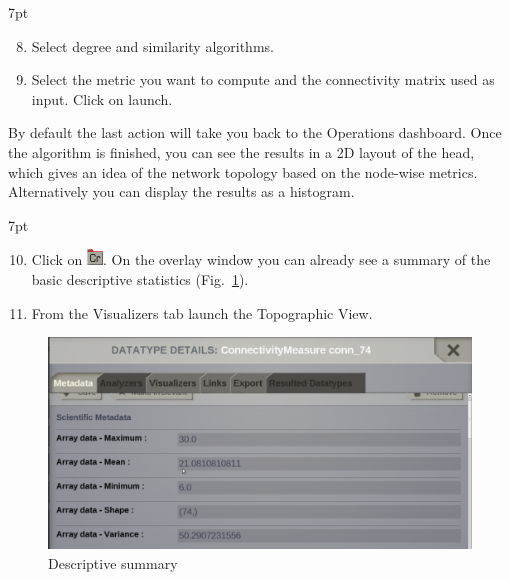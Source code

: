 \documentclass{tufte-handout}
\newenvironment{formal}{%
  \def\FrameCommand{%
    \hspace{1pt}%
    {\color{DarkBlue}\vrule width 2pt}%
    {\color{formalshade}\vrule width 4pt}%
    \colorbox{formalshade}%
  }%
  \MakeFramed{\advance\hsize-\width\FrameRestore}%
  \noindent\hspace{-4.55pt}%
  \begin{adjustwidth}{}{7pt}%
  \vspace{2pt}\vspace{2pt}%
}
{%
  \vspace{2pt}\end{adjustwidth}\endMakeFramed%
}
\begin{document}
\begin{formal}
  \begin{enumerate}[resume]
  \setcounter{enumi}{7}
  \item Select degree and similarity algorithms. 
  \item Select the metric you want to compute and the connectivity matrix used as input. Click on launch. 
  \end{enumerate}
\end{formal}


\noindent By default the last action will take you back to the Operations dashboard.
Once the algorithm is finished, you can see the results in a 2D layout of the
head, which gives an idea of the network topology based on the node-wise
metrics. Alternatively you can display the results as a histogram. 

\begin{formal}
  \begin{enumerate}[resume]
  \setcounter{enumi}{9}
  \item Click on \includegraphics[width=0.042\linewidth]{nodeConnectivityMeasure}. On
  the overlay window you can already see a summary of the basic descriptive
  statistics (Fig.~\ref{fig:step_02}).

  \item From the Visualizers tab launch the Topographic View.
  \end{enumerate}
\end{formal}

\begin{figure}[h]
  \includegraphics[width=\linewidth]{Handout_UI_ModellingStructuralLesions_AnalysisResult}%
  \caption{Descriptive summary}%
  \label{fig:step_02}%
\end{figure}
\end{document}
